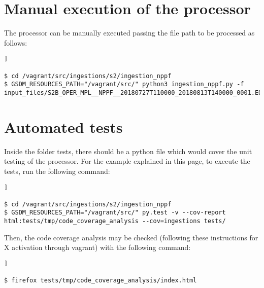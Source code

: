 \section{Manual execution of the processor}

The processor can be manually executed passing the file path to be processed as follows:

\begin{lstlisting}[breaklines=true, style=bash]]

$ cd /vagrant/src/ingestions/s2/ingestion_nppf
$ GSDM_RESOURCES_PATH="/vagrant/src/" python3 ingestion_nppf.py -f input_files/S2B_OPER_MPL__NPPF__20180727T110000_20180813T140000_0001.EOF

\end{lstlisting}

\section{Automated tests}

Inside the folder tests, there should be a python file which would cover the unit testing of the processor. For the example explained in this page, to execute the tests, run the following command:

\begin{lstlisting}[breaklines=true, style=bash]]

$ cd /vagrant/src/ingestions/s2/ingestion_nppf
$ GSDM_RESOURCES_PATH="/vagrant/src/" py.test -v --cov-report html:tests/tmp/code_coverage_analysis --cov=ingestions tests/

\end{lstlisting}

Then, the code coverage analysis may be checked (following these instructions for X activation through vagrant) with the following command:

\begin{lstlisting}[breaklines=true, style=bash]]

$ firefox tests/tmp/code_coverage_analysis/index.html

\end{lstlisting}
